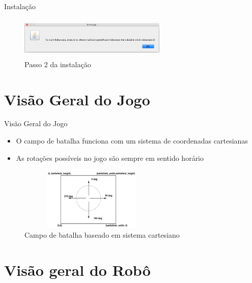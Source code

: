 \begin{frame}
	\begin{block}{Instalação}
		 \begin{figure}[!htb]
			\centering	  				
			\includegraphics[height=2cm, width = 7cm]{./pic/instalacao02.png}
			\caption{Passo 2 da instalação}
			\label{fig_instalacao02}
		\end{figure}
	\end{block}
\end{frame}



\section{Visão Geral do Jogo}

\begin{frame}
	\begin{block}{Visão Geral do Jogo}
		\begin{itemize}
			\item O campo de batalha funciona com um sistema de coordenadas cartesianas
			\item As rotações possíveis no jogo são sempre em sentido horário			
		\end{itemize}
		
		\begin{figure}[!htb]
			\centering
			\includegraphics[height=3cm, width = 7cm]{./pic/campoBatalha.png}
			\caption{Campo de batalha baseado em sistema cartesiano  \citep{ROBOWIKI}}
			\label{fig_instalacao03}
		\end{figure}
	\end{block}
\end{frame}


\section{Visão geral do Robô}

